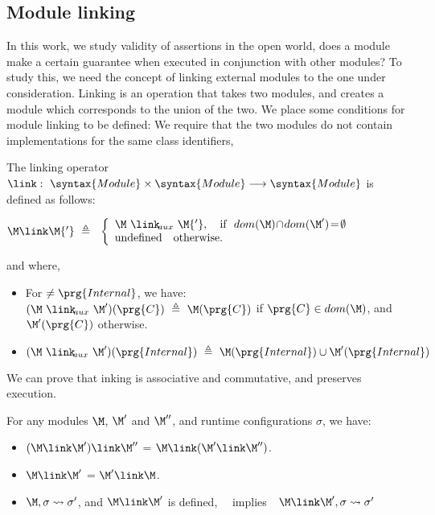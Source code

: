\subsection{Module linking}

In this work, we study validity of assertions in the open world, \ie   does a module 
make a certain guarantee when executed in conjunction with other modules? To study this, we 
 need the concept of linking external modules to the one  under consideration.
 Linking is an operation that takes two modules, and creates a module which corresponds  to the union of the two. 
We place some conditions for module linking to be defined: We require that the two modules do not contain implementations for the same class identifiers,  

\begin{definition}

The linking operator\  \ $\link:\  \syntax{Module} \times  \syntax{Module} \longrightarrow \syntax{Module}$ is defined as follows:

$
\M \link \M{'}  \ \triangleq  \ \ \left\{
\begin{array}{l}
                        \M\ \link\!_{aux}\ \M{'},\ \ \   \hbox{if}\  \ dom(\M)\!\cap\!dom(\M')\!=\!\emptyset\\
\mbox{undefined}  \ \ \ \mbox{otherwise.}
\end{array}
                    \right.$
                    
and where,                  
\begin{itemize}
     \item 
   For $\neq\prg{Internal}$, we have: \ \
   $(\M\ \link\!_{aux}\ \M')(\prg{C})\  \triangleq  \ \M(\prg{C})$  if  $\prg{C}\in dom(\M)$, and  $\M'(\prg{C})$ otherwise.
    \item  
   $(\M\ \link\!_{aux}\ \M')(\prg{Internal}) \  \triangleq  \ \M(\prg{Internal}) \cup  \M'(\prg{Internal})$
 \end{itemize}
\end{definition}

We can prove that inking is associative and commutative, and preserves execution.
 
 \begin{lemma}
 For any modules $\M$,   $\M'$ and $\M''$, and runtime configurations $\sigma$, we have$:$
 \label{lemma:linking:properties}
 
 \begin{itemize}
     \item 
     $(\M \link \M')\link \M''$ = $\M \link (\M' \link \M'')$.
    \item  
      $\M \link \M'$  = $\M' \link\M$.
      \item
      $\M, \sigma \leadsto \sigma'$, and $\M\link \M'$ is defined, \  \  implies\ \   $\M\link \M', \sigma \leadsto \sigma'$
   \end{itemize}
 
 \end{lemma}
 
